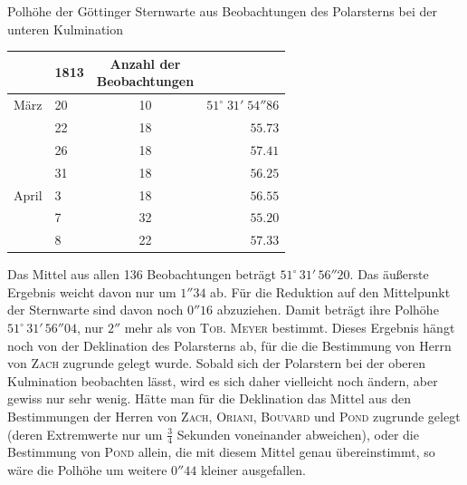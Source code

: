 \begin{center}Polhöhe der Göttinger Sternwarte aus Beobachtungen des Polarsterns bei der unteren Kulmination\end{center}
\begin{center}\fontsize{10}{12}\selectfont\setlength{\tabcolsep}{7pt}\renewcommand{\arraystretch}{1.15}\begin{tabular}{ll|c|r}
& 1813 & \shortstack{Anzahl der\\Beobachtungen} &\\\hline
März & 20 & 10 & $51^\circ\;31'\;54''86$\\
& 22 & 18 & $55.73$\\
& 26 & 18 & $57.41$\\
& 31 & 18 & $56.25$\\
April & 3 & 18 & $56.55$\\
& 7 & 32 & $55.20$\\
& 8 & 22 & $57.33$\\
\end{tabular}\end{center}

\par\indent{}Das Mittel aus allen 136 Beobachtungen beträgt $51^\circ\,31'\,56''20$. Das äußerste Ergebnis weicht davon nur um $1''34$ ab. Für die Reduktion auf den Mittelpunkt der Sternwarte sind davon noch $0''16$ abzuziehen. Damit beträgt ihre Polhöhe $51^\circ\,31'\,56''04$, nur $2''$ mehr als von \textsc{Tob. Meyer} bestimmt. Dieses Ergebnis hängt noch von der Deklination des Polarsterns ab, für die die Bestimmung von Herrn von \textsc{Zach} zugrunde gelegt wurde. Sobald sich der Polarstern bei der oberen Kulmination beobachten lässt, wird es sich daher vielleicht noch ändern, aber gewiss nur sehr wenig. Hätte man für die Deklination das Mittel aus den Bestimmungen der Herren von \textsc{Zach}, \textsc{Oriani}, \textsc{Bouvard} und \textsc{Pond} zugrunde gelegt (deren Extremwerte nur um $\frac{3}{4}$ Sekunden voneinander abweichen), oder die Bestimmung von \textsc{Pond} allein, die mit diesem Mittel genau übereinstimmt, so wäre die Polhöhe um weitere $0''44$ kleiner ausgefallen.

